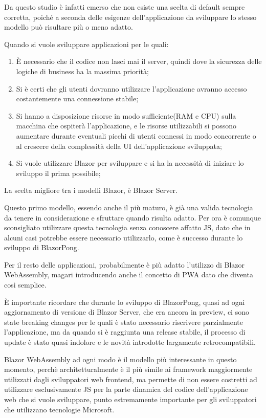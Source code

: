 Da questo studio \`e infatti emerso che non esiste una scelta di default sempre corretta, poich\'e a seconda delle esigenze dell'applicazione da sviluppare lo stesso modello pu\`o risultare pi\`u o meno adatto.

Quando si vuole sviluppare applicazioni per le quali:
\begin{enumerate}
	\item \`E necessario che il codice non lasci mai il server, quindi dove la sicurezza delle logiche di business ha la massima priorit\`a;
	\item Si \`e certi che gli utenti dovranno utilizzare l'applicazione avranno accesso costantemente una connessione stabile;
	\item Si hanno a disposizione risorse in modo sufficiente(RAM e CPU) sulla macchina che ospiter\`a l'applicazione, e le risorse utilizzabili si possono aumentare durante eventuali picchi di utenti connessi in modo concorrente o al crescere della complessit\`a della UI dell'applicazione sviluppata;
	\item Si vuole utilizzare Blazor per sviluppare e si ha la necessit\`a di iniziare lo sviluppo il prima possibile;
\end{enumerate}

La scelta migliore tra i modelli Blazor, \`e Blazor Server.

Questo primo modello, essendo anche il pi\`u maturo, \`e gi\`a una valida tecnologia da tenere in considerazione e sfruttare quando risulta adatto.
Per ora \`e comunque sconsigliato utilizzare questa tecnologia senza conoscere affatto JS, dato che in alcuni casi potrebbe essere necessario utilizzarlo, come \`e successo durante lo sviluppo di BlazorPong.

Per il resto delle applicazioni, probabilmente \`e pi\`u adatto l'utilizzo di Blazor WebAssembly, magari introducendo anche il concetto di PWA dato che diventa cos\`i semplice.

\`E importante ricordare che durante lo sviluppo di BlazorPong, quasi ad ogni aggiornamento di versione di Blazor Server, che era ancora in preview, ci sono state breaking changes per le quali \`e stato necessario riscrivere parzialmente l'applicazione, ma da quando si \`e raggiunta una release stabile, il processo di update \`e stato quasi indolore e le novit\`a introdotte largamente retrocompatibili.

Blazor WebAssembly ad ogni modo \`e il modello pi\`u interessante in questo momento, perch\`e architetturalmente \`e il pi\`u simile ai framework maggiormente utilizzati dagli sviluppatori web frontend, ma permette di non essere costretti ad utilizzare esclusivamente JS per la parte dinamica del codice dell'applicazione web che si vuole sviluppare, punto estremamente importante per gli sviluppatori che utilizzano tecnologie Microsoft.

